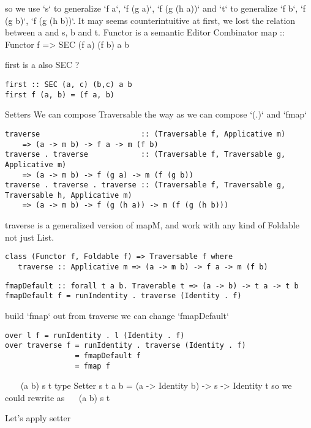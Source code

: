 so we use `s` to generalize `f a`,  `f (g a)`, `f (g (h a))` and `t` to generalize `f b`,  `f (g b)`, `f (g (h b))`.
It may seems counterintuitive at first, we lost the relation between a and s, b and t.
Functor is a semantic Editor Combinator
map :: Functor f => SEC (f a) (f b) a b

first is a also SEC ?
\begin{verbatim}
first :: SEC (a, c) (b,c) a b
first f (a, b) = (f a, b)
\end{verbatim}
Setters
We can compose Traversable the way as we can compose `(.)` and `fmap`

\begin{verbatim}
traverse                       :: (Traversable f, Applicative m) 
    => (a -> m b) -> f a -> m (f b)
traverse . traverse            :: (Traversable f, Traversable g, Applicative m) 
    => (a -> m b) -> f (g a) -> m (f (g b))
traverse . traverse . traverse :: (Traversable f, Traversable g, Traversable h, Applicative m) 
    => (a -> m b) -> f (g (h a)) -> m (f (g (h b)))
\end{verbatim}

traverse is a generalized version of mapM, and work with any kind of Foldable not just List.

\begin{verbatim}
class (Functor f, Foldable f) => Traversable f where
   traverse :: Applicative m => (a -> m b) -> f a -> m (f b)
\end{verbatim}

\begin{verbatim}
fmapDefault :: forall t a b. Traverable t => (a -> b) -> t a -> t b
fmapDefault f = runIndentity . traverse (Identity . f)
\end{verbatim}

build `fmap` out from traverse
we can change `fmapDefault`

\begin{verbatim}
over l f = runIdentity . l (Identity . f)
over traverse f = runIdentity . traverse (Identity . f)
                = fmapDefault f
                = fmap f
\end{verbatim}


~\hs{::}~~\hs{->} (a \hs{->} b) \hs{->} s \hs{->} t
type Setter s t a b = (a -> Identity b) -> s -> Identity t
so we could rewrite  as
~\hs{::}~ \hs{->} (a \hs{->} b) \hs{->} s \hs{->} t

Let’s apply setter

